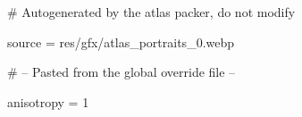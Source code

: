 # Autogenerated by the atlas packer, do not modify

source = res/gfx/atlas_portraits_0.webp

# -- Pasted from the global override file --

anisotropy = 1
